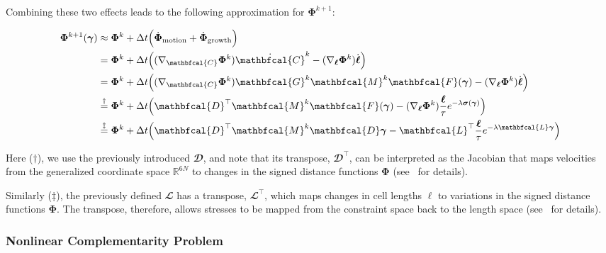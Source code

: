 \documentclass[conference]{IEEEtran}
\begin{document}
Combining these two effects leads to the following approximation for $\mathbf{\Phi}^{k+1}$:

\begin{equation}\label{eq:phi_expanded}
    \small
    \begin{split}
        \mathbf{\Phi}^{k+1}(\boldsymbol{\gamma}) & \approx \mathbf{\Phi}^k + \Delta t \Bigl( \dot{\mathbf{\Phi}}_{\text{motion}} + \dot{\mathbf{\Phi}}_{\text{growth}} \Bigr)\\
        & = \mathbf{\Phi}^k + \Delta t \Bigl( (\nabla_{\mathbfcal{C}} \mathbf{\Phi}^k) \dot{\mathbfcal{C}}^k - (\nabla_{\boldsymbol{\ell}} \mathbf{\Phi}^k) \dot{\boldsymbol{\ell}} \Bigr)\\
        & = \mathbf{\Phi}^k + \Delta t \Bigl( (\nabla_{\mathbfcal{C}} \mathbf{\Phi}^k) \mathbfcal{G}^k \mathbfcal{M}^k  \mathbfcal{F}(\boldsymbol{\gamma}) - (\nabla_{\boldsymbol{\ell}} \mathbf{\Phi}^k) \dot{\boldsymbol{\ell}} \Bigr)\\
        & \overset{\dagger}{=}
        \mathbf{\Phi}^k + \Delta t \Bigl( \mathbfcal{D}^\top \mathbfcal{M}^k  \mathbfcal{F}(\boldsymbol{\gamma})
        - (\nabla_{\boldsymbol{\ell}} \mathbf{\Phi}^k) \frac{\boldsymbol{\ell}}{\tau}
        e^{-\lambda \boldsymbol{\sigma}(\boldsymbol{\gamma})} \Bigr)\\
        & \overset{\ddagger}{=} \mathbf{\Phi}^k + \Delta t \Bigl( \mathbfcal{D}^\top \mathbfcal{M}^k \mathbfcal{D} \boldsymbol{\gamma} - \mathbfcal{L}^\top \frac{\boldsymbol{\ell}}{\tau} e^{-\lambda \mathbfcal{L} \boldsymbol{\gamma}} \Bigr)
    \end{split}
\end{equation}

Here ($\dagger$), we use the previously introduced $\mathbfcal{D}$, and note that its transpose, $\mathbfcal{D}^\top$, can be interpreted as the Jacobian that maps velocities from the generalized coordinate space $\mathbb{R}^{6N}$ to changes in the signed distance functions $\mathbf{\Phi}$ (see~\cite{Weady2024SM, Tasora2008} for details).

Similarly ($\ddagger$), the previously defined $\mathbfcal{L}$ has a transpose, $\mathbfcal{L}^\top$, which maps changes in cell lengths $\boldsymbol{\ell}$ to variations in the signed distance functions $\mathbf{\Phi}$. The transpose, therefore, allows stresses to be mapped from the constraint space back to the length space (see~\cite{Weady2024SM} for details).

\subsubsection{Nonlinear Complementarity Problem}
\end{document}

